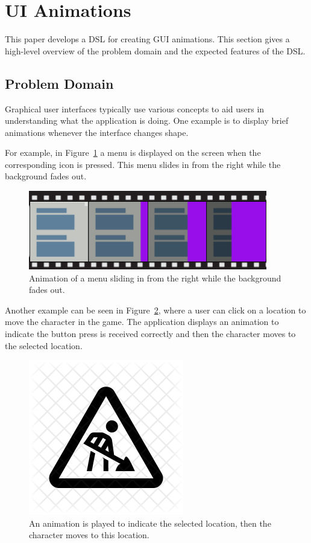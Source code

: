 \section{UI Animations}
\label{sec:ui_animations}

This paper develops a DSL for creating GUI animations. This section gives a high-level overview of the problem domain and the expected features of the DSL.

\subsection{Problem Domain}

Graphical user interfaces typically use various concepts to aid users in understanding what the application is doing. One example is to display brief animations whenever the interface changes shape.

For example, in Figure~\ref{fig:usecase1} a menu is displayed on the screen when the corresponding icon is pressed. This menu slides in from the right while the background fades out.

\begin{figure}[H]
\centering
\includegraphics[scale=0.4]{pictures/usecase1fig.png}
\caption{Animation of a menu sliding in from the right while the background fades out.}
\label{fig:usecase1}
\end{figure}

Another example can be seen in Figure~\ref{fig:usecase2}, where a user can click on a location to move the character in the game. The application displays an animation to indicate the button press is received correctly and then the character moves to the selected location.

\begin{figure}[H]
\centering
\includegraphics[scale=0.4]{pictures/todo.png}
\caption{An animation is played to indicate the selected location, then the character moves to this location.}
\label{fig:usecase2}
\end{figure}

